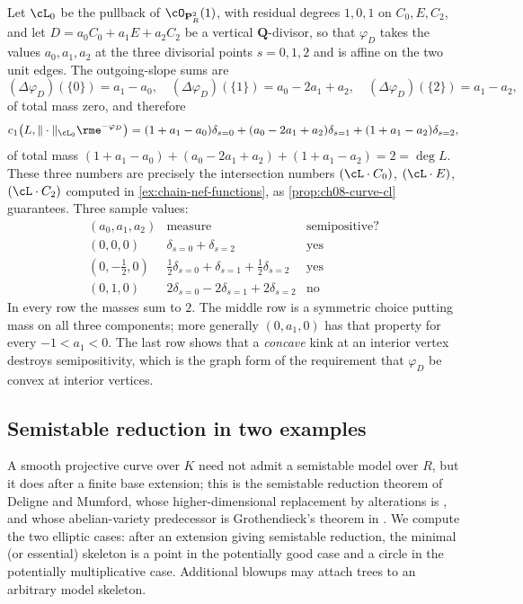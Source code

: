 Let $\cL_0$ be the pullback of $\cO_{\mathbf P^2_R}(1)$, with residual
degrees $1,0,1$ on $C_0,E,C_2$, and let $D=a_0C_0+a_1E+a_2C_2$ be a vertical
$\mathbf Q$-divisor, so that $\varphi_D$ takes the values $a_0,a_1,a_2$ at
the three divisorial points $s=0,1,2$ and is affine on the two unit edges.
The outgoing-slope sums are
\[
 (\Delta\varphi_D)(\{0\})=a_1-a_0,\quad
 (\Delta\varphi_D)(\{1\})=a_0-2a_1+a_2,\quad
 (\Delta\varphi_D)(\{2\})=a_1-a_2 ,
\]
of total mass zero, and therefore
\begin{equation}
\label{eq:ch08-chain-measure}
 c_1\bigl(L,\|\cdot\|_{\cL_0}\rme^{-\varphi_D}\bigr)
 =(1+a_1-a_0)\delta_{s=0}
  +(a_0-2a_1+a_2)\delta_{s=1}
  +(1+a_1-a_2)\delta_{s=2} ,
\end{equation}
of total mass
$(1+a_1-a_0)+(a_0-2a_1+a_2)+(1+a_1-a_2)=2=\deg L$.  These three numbers are
precisely the intersection numbers
$(\cL\cdot C_0)$, $(\cL\cdot E)$, $(\cL\cdot C_2)$ computed in
\cref{ex:chain-nef-functions}, as
\cref{prop:ch08-curve-cl} guarantees.  Three sample values:
\[
\begin{array}{c|c|c}
 (a_0,a_1,a_2) & \text{measure} & \text{semipositive?}\\ \hline
 (0,0,0) & \delta_{s=0}+\delta_{s=2} & \text{yes}\\
 (0,-\tfrac12,0) &
   \tfrac12\delta_{s=0}+\delta_{s=1}+\tfrac12\delta_{s=2} & \text{yes}\\
 (0,1,0) & 2\delta_{s=0}-2\delta_{s=1}+2\delta_{s=2} & \text{no}
\end{array}
\]
In every row the masses sum to $2$.  The middle row is a symmetric
choice putting mass on all three components; more generally
$(0,a_1,0)$ has that property for every $-1<a_1<0$.  The last row shows that a
\emph{concave} kink at an interior vertex destroys semipositivity, which is
the graph form of the requirement that $\varphi_D$ be convex at interior
vertices.

\subsection{Semistable reduction in two examples}
\label{sec:ch08-semistable-reduction}

A smooth projective curve over $K$ need not admit a semistable model over
$R$, but it does after a finite base extension; this is the semistable
reduction theorem of Deligne and Mumford, whose higher-dimensional
replacement by alterations is \cite{deJong1996}, and whose abelian-variety
predecessor is Grothendieck's theorem in \cite{SGA7I}.  We compute the two
elliptic cases: after an extension giving semistable reduction, the minimal
(or essential) skeleton is a point in the potentially good case and a
circle in the potentially multiplicative case.  Additional blowups may
attach trees to an arbitrary model skeleton.

